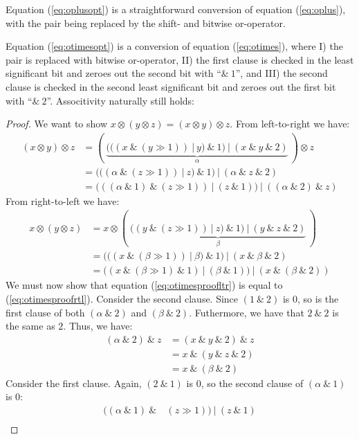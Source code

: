 Equation (\ref{eq:oplusopt}) is a straightforward conversion of equation
(\ref{eq:oplus}), with the pair being replaced by the shift- and bitwise or-operator.

Equation (\ref{eq:otimesopt}) is a conversion of equation (\ref{eq:otimes}),
where I) the pair is replaced with bitwise or-operator, II) the first clause is checked
in the least significant bit and zeroes out the second bit with ``$\&~1$'', and
III) the second clause is checked in the second least significant bit and zeroes
out the first bit with ``$\&~2$''. Associtivity naturally still holds:

\begin{proof}
  We want to show $x \otimes (y \otimes z) = (x \otimes y) \otimes z$. From left-to-right we have:
\begin{align}
  (x \otimes y) \otimes z &= (~\underbrace{(((x~\&~(y \gg 1))~|~y)~\&~1)~|~(x~\&~y~\&~2)}_{\alpha}~) \otimes z\\
              &= (((\alpha~\&~(z \gg 1))~|~z)~\&~1)~|~(\alpha~\&~z~\&~2)\\
              \label{eq:otimesproofltr}
              &= (((\alpha~\&~1)~\&~(z \gg 1))~|~(z~\&~1))~|~((\alpha~\&~2)~\&~z)
\end{align}
From right-to-left we have:
\begin{align}
  x \otimes (y \otimes z) &= x \otimes (~\underbrace{((y~\&~(z \gg 1))~|~z)~\&~1)~|~(y~\&~z~\&~2)}_{\beta}~)\\
  &= (((x~\&~(\beta \gg 1))~|~\beta)~\&~1)~|~(x~\&~\beta~\&~2)\\
  \label{eq:otimesproofrtl}
  &= ((x~\&~(\beta \gg 1)~\&~1)~|~(\beta~\&~1))~|~(x~\&~(\beta~\&~2))
\end{align}
We must now show that equation (\ref{eq:otimesproofltr}) is equal to
(\ref{eq:otimesproofrtl}). Consider the second clause. Since $(1~\&~2)$ is $0$,
so is the first clause of both $(\alpha~\&~2)$ and $(\beta~\&~2)$. Futhermore, we have
that $2~\&~2$ is the same as $2$. Thus, we have:
\begin{align}
  (\alpha~\&~2)~\&~z &= (x~\&~y~\&~2)~\&~z\\
                &= x~\&~(y~\&~z~\&~2)\\
                &= x~\&~(\beta~\&~2)
\end{align}
Consider the first clause. Again, $(2~\&~1)$ is $0$, so the second clause of $(\alpha~\&~1)$ is $0$:
\begin{align}
  ((\alpha~\&~1)~\&~&(z \gg 1))~|~(z~\&~1) \\

\end{align}
\end{proof}
